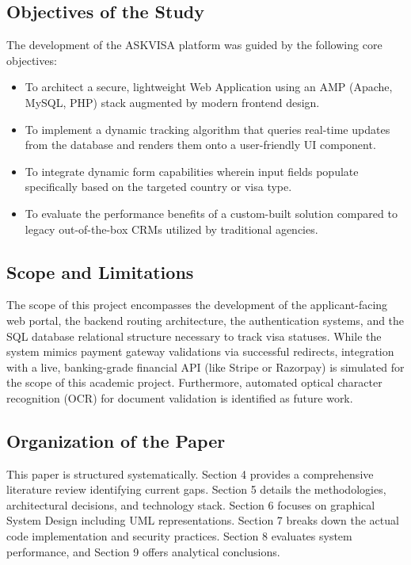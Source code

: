 \documentclass[12pt, a4paper]{article}
\begin{document}
\subsection{Objectives of the Study}
The development of the ASKVISA platform was guided by the following core objectives:
\begin{itemize}
    \item To architect a secure, lightweight Web Application using an AMP (Apache, MySQL, PHP) stack augmented by modern frontend design.
    \item To implement a dynamic tracking algorithm that queries real-time updates from the database and renders them onto a user-friendly UI component.
    \item To integrate dynamic form capabilities wherein input fields populate specifically based on the targeted country or visa type.
    \item To evaluate the performance benefits of a custom-built solution compared to legacy out-of-the-box CRMs utilized by traditional agencies.
\end{itemize}

\subsection{Scope and Limitations}
The scope of this project encompasses the development of the applicant-facing web portal, the backend routing architecture, the authentication systems, and the SQL database relational structure necessary to track visa statuses. While the system mimics payment gateway validations via successful redirects, integration with a live, banking-grade financial API (like Stripe or Razorpay) is simulated for the scope of this academic project. Furthermore, automated optical character recognition (OCR) for document validation is identified as future work.

\subsection{Organization of the Paper}
This paper is structured systematically. Section 4 provides a comprehensive literature review identifying current gaps. Section 5 details the methodologies, architectural decisions, and technology stack. Section 6 focuses on graphical System Design including UML representations. Section 7 breaks down the actual code implementation and security practices. Section 8 evaluates system performance, and Section 9 offers analytical conclusions.
\end{document}

